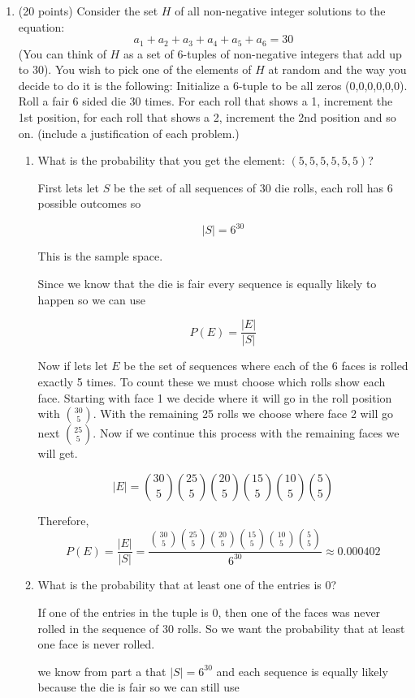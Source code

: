 \documentclass[10pt,letterpaper,unboxed,cm]{article}
\begin{document}
\begin{enumerate}
\item (20 points)
Consider the set $H$ of all non-negative integer solutions to the equation:
$$a_1 + a_2 + a_3 + a_4 + a_5 + a_6 = 30$$
(You can think of $H$ as a set of 6-tuples of non-negative integers that add up to
30).
You wish to pick one of the elements of $H$ at random and the way you decide to do
it is the following:
Initialize a 6-tuple to be all zeros (0,0,0,0,0,0).
Roll a fair 6 sided die 30 times. For each roll that shows a 1, increment the 1st
position, for each roll that shows a 2, increment the 2nd position and so on.
(include a justification of each problem.)
\begin{enumerate}
\item
What is the probability that you get the element: $(5,5,5,5,5,5)$?

First lets let \(S\) be the set of all sequences of 30 die rolls, each roll has 6 possible outcomes so 

\[|S| = 6^{30}\]

This is the sample space.

Since we know that the die is fair every sequence is equally likely to happen so we can use 

\[P(E) = \frac{|E|}{|S|}\]

Now if lets let \(E\) be the set of sequences where each of the 6 faces is rolled exactly 5 times. To count these we must choose which rolls show each face. Starting with face 1 we decide where it will go in the roll position with \(\binom{30}{5}\). With the remaining 25 rolls we choose where face 2 will go next \(\binom{25}{5}\). Now if we continue this process with the remaining faces we will get.

\[|E| = \binom{30}{5}\binom{25}{5}\binom{20}{5}\binom{15}{5}\binom{10}{5}\binom{5}{5}\]

Therefore,
\[P(E) = \frac{|E|}{|S|} = \frac{\binom{30}{5}\binom{25}{5}\binom{20}{5}\binom{15}{5}\binom{10}{5}\binom{5}{5}}{6^{30}} \approx 0.000402\]

\item
What is the probability that at least one of the entries is $0$?

If one of the entries in the tuple is 0, then one of the faces was never rolled in the sequence of 30 rolls. So we want the probability that at least one face is never rolled.

we know from part a that \(|S| = 6^{30}\) and each sequence is equally likely because the die is fair so we can still use 


\end{enumerate}
\end{enumerate}
\end{document}
